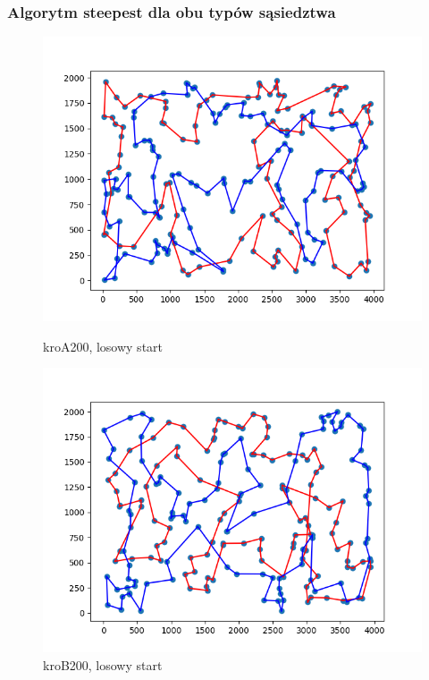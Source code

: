 \documentclass[11pt]{article}
\begin{document}
\subsubsection{Algorytm steepest dla obu typów sąsiedztwa}
\begin{figure}[H]
    \centering
    \begin{minipage}[t]{0.45\textwidth}
        \centering
        \includegraphics[width=\linewidth]{best_paths/kroA200/traverse_steepest_both/randomstart}
        \caption{kroA200, losowy start}
    \end{minipage}
    \hfill
    \begin{minipage}[t]{0.45\textwidth}
        \centering
        \includegraphics[width=\linewidth]{best_paths/kroB200/traverse_steepest_both/randomstart}
        \caption{kroB200, losowy start}
    \end{minipage}


\end{figure}
\end{document}
